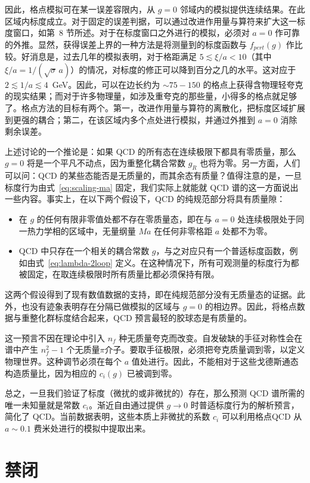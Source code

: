 因此，格点模拟可在某一误差容限内，从 $g = 0$ 邻域内的模拟提供连续结果。在此区域内标度成立。对于固定的误差判据，可以通过改进作用量与算符来扩大这一标度窗口，如第~8 节所述。对于在标度窗口之外进行的模拟，必须对 $a = 0$ 作可靠的外推。显然，获得误差上界的一种方法是将测量到的标度函数与 $f_{pert}(g)$ 作比较。好消息是，过去几年的模拟表明，对于格距满足 $5 \lesssim \xi/a < 10$（其中 $\xi/a = 1/(\sqrt{\sigma}\,a)$）的情况，对标度的修正可以降到百分之几的水平。这对应于 $2 \lesssim 1/a \lesssim 4$~GeV。因此，可以在边长约为 $\sim 75 - 150$ 的格点上获得含物理轻夸克的现实结果；而对于许多物理量，如涉及重夸克的那些量，小得多的格点就足够了。格点方法的目标有两个。第一，改进作用量与算符的离散化，把标度区域扩展到更强的耦合；第二，在该区域内多个点处进行模拟，并通过外推到 $a = 0$ 消除剩余误差。

上述讨论的一个推论是：如果 QCD 的所有态在连续极限下都具有零质量，那么 $g = 0$ 将是一个平凡不动点，因为重整化耦合常数 $g_R$ 也将为零。另一方面，人们可以问：QCD 的某些态能否是无质量的，而其余态有质量？值得注意的是，一旦标度行为由式~\eqref{eq:scaling-ma} 固定，我们实际上就能就 QCD 谱的这一方面说出一些内容。事实上，在以下两个假设下，QCD 的纯规范部分将具有质量隙：
\begin{itemize}
  \item 在 $g$ 的任何有限非零值处都不存在零质量态，即在与 $a = 0$ 处连续极限处于同一热力学相的区域中，无量纲量 $M a$ 在任何非零格距 $a$ 处都不为零。
  \item QCD 中只存在一个相关的耦合常数 $g$，与之对应只有一个普适标度函数，例如由式~\eqref{eq:lambda-2loop} 定义。在这种情况下，所有可观测量的标度行为都被固定，在取连续极限时所有质量比都必须保持有限。
\end{itemize}
这两个假设得到了现有数值数据的支持，即在纯规范部分没有无质量态的证据。此外，也没有迹象表明存在分隔已做模拟的区域与 $g = 0$ 的相边界。因此，将格点数据与重整化群标度结合起来，QCD 预言最轻的胶球态是有质量的。

这一预言不因在理论中引入 $n_f$ 种无质量夸克而改变。自发破缺的手征对称性会在谱中产生 $n_f^2 - 1$ 个无质量$\pi$介子。要取手征极限，必须把夸克质量调到零，以定义物理世界。这种调节必须在每个 $a$ 值处进行。因此，不能相对于这些戈德斯通态构造质量比，因为相应的 $c_i(g)$ 已被调到零。

总之，一旦我们验证了标度（微扰的或非微扰的）存在，那么预测 QCD 谱所需的唯一未知量就是常数 $c_i$。渐近自由通过提供 $g \to 0$ 时普适标度行为的解析预言，简化了 QCD。当前数据表明，这些本质上非微扰的系数 $c_i$ 可以利用格点QCD 从 $a \sim 0.1$ 费米处进行的模拟中提取出来。

\section{禁闭}
\label{sec:confinement}


